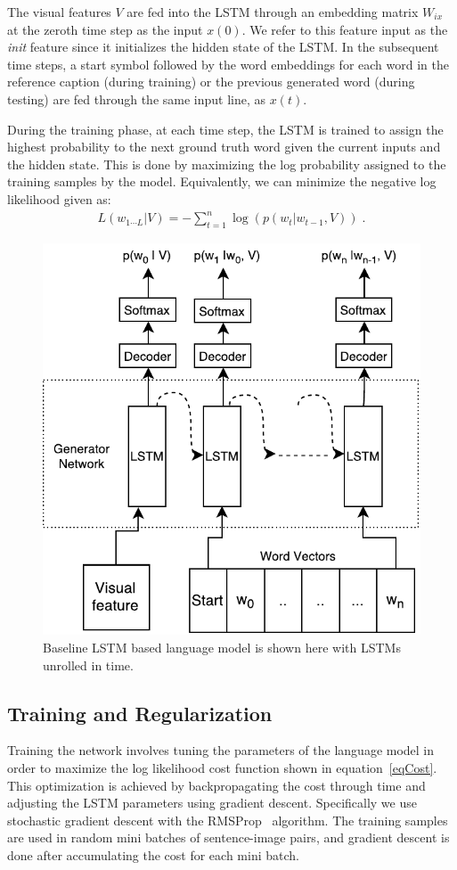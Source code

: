The visual features $V$ are fed into the LSTM through an embedding matrix
$W_{ix}$ at the zeroth time step as the input $x(0)$.
We refer to this feature input as the \emph{init} feature since it initializes
the hidden state of the LSTM.
In the subsequent time steps, a start symbol followed by the word embeddings for
each word in the reference caption (during training) or the previous generated
word (during testing) are fed through the same input line, as $x(t)$.

During the training phase, at each time step, the LSTM is trained to assign the
highest probability to the next ground truth word given the current inputs and
the hidden state.
This is done by maximizing the log probability assigned to the training samples
by the model. 
Equivalently, we can minimize the negative log likelihood given as:
\begin{align}
  \label{eqCost}
  L(w_{1\cdots L} | V) = -\sum_{t=1}^n \log(p(w_t|w_{t-1},V)) \; .
\end{align}
\begin{figure}[h]
\begin{center}
   \includegraphics[width=0.5\linewidth]{images/Thesis_lstmLangGen.pdf}
\end{center}
\vspace*{-4mm}
\caption{Baseline LSTM based language model is shown here with
  LSTMs unrolled in time.}
\label{fig:baselinelstmlang}
\end{figure}

\subsection{Training and Regularization}
Training the network involves tuning the parameters of the language model
in order to maximize the log likelihood cost function shown in equation~\ref{eqCost}.
This optimization is achieved by backpropagating the cost through time and
adjusting the LSTM parameters using gradient descent.
Specifically we use stochastic gradient descent with the
RMSProp~\cite{rmspropTielman} algorithm.
The training samples are used in random mini batches of sentence-image pairs,
and gradient descent is done after accumulating the cost for each mini batch. 

